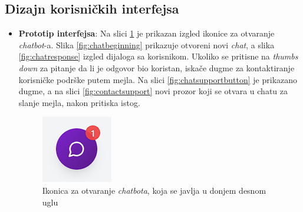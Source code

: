 \subsection{Dizajn korisničkih interfejsa}  
\begin{itemize}  
    \item \textbf{Prototip interfejsa}: Na slici \ref{fig:chatbotikona} je prikazan izgled ikonice za otvaranje \textit{chatbot}-a. Slika \ref{fig:chatbeginning} prikazuje otvoreni novi \textit{chat}, a slika \ref{fig:chatresponse} izgled dijaloga sa korisnikom. Ukoliko se pritisne na \textit{thumbs down} za pitanje da li je odgovor bio koristan, iskače dugme za kontaktiranje korisničke podrške putem mejla. Na slici \ref{fig:chatsupportbutton} je prikazano dugme, a na slici \ref{fig:contactsupport} novi prozor koji se otvara u chatu za slanje mejla, nakon pritiska istog. 


\begin{figure}[H]
    \centering
    \includegraphics[width=0.25\linewidth]{Slike/FZ6/chatbotbubble.png}
    \caption{Ikonica za otvaranje \textit{chatbota}, koja se javlja u donjem desnom uglu}
    \label{fig:chatbotikona}
\end{figure}


\end{itemize}
